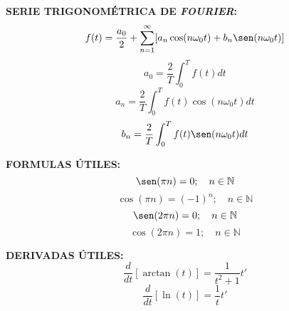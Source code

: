 \documentclass[letter,twoside,8pt]{article}
\begin{document}
\textbf{SERIE TRIGONOMÉTRICA DE \emph{FOURIER}:}
\begin{equation*}
    f(t)=\frac{a_0}{2}+\sum_{n=1}^{\infty}[a_n\cos(n{\omega_0}t)+b_n\sen(n{\omega_0}t)]
\end{equation*}
\begin{equation*}
    a_0=\frac{2}{T}\int_{0}^{T}f(t){dt}
\end{equation*}
\begin{equation*}
    a_n=\frac{2}{T}\int_{0}^{T}f(t)\cos(n{\omega_0}t){dt}
\end{equation*}
\begin{equation*}
    b_n=\frac{2}{T}\int_{0}^{T}f(t)\sen(n{\omega_0}t){dt}
\end{equation*}

\textbf{FORMULAS ÚTILES:}
\begin{equation*}
    \sen({\pi}n)=0;\quad{n}\in\mathbb{N}
\end{equation*}
\begin{equation*}
    \cos({\pi}n)={(-1)}^n;\quad{n}\in\mathbb{N}
\end{equation*}
\begin{equation*}
    \sen({2\pi}n)=0;\quad{n}\in\mathbb{N}
\end{equation*}
\begin{equation*}
    \cos({2\pi}n)=1;\quad{n}\in\mathbb{N}
\end{equation*}

\textbf{DERIVADAS ÚTILES:}
\begin{equation*}
    \frac{d}{dt}[\arctan(t)]=\frac{1}{t^2+1}t'
\end{equation*}
\begin{equation*}
    \frac{d}{dt}[\ln(t)]=\frac{1}{t}t'
\end{equation*}
\end{document}
